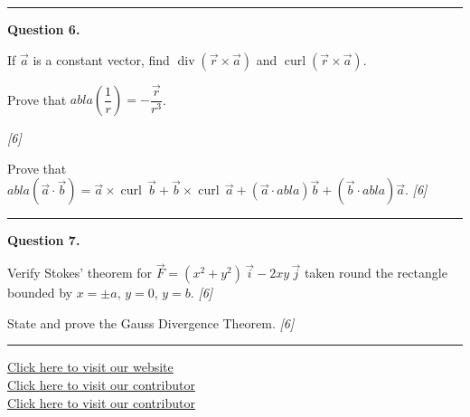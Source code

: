 \documentclass[11pt,a4paper]{article}
\newcommand{\pts}[1]{\hfill   \textit{[#1]}}
\begin{document}
\medskip\rule{\linewidth}{0.2pt}

\medskip


\noindent   \textbf{Question 6.}

\begin{parts}
  \item
  
\begin{parts}
    \item If $\vec{a}$ is a constant vector, find $\operatorname{div}(\vec{r} \times\vec{a})$ and $\operatorname{curl}(\vec{r} \times\vec{a})$.
    \item Prove that $
abla\!\left(\dfrac{1}{r}\right) = -\dfrac{\vec{r}}{r^3}$.
  \end{parts} \pts{6}
  \item Prove that $
abla(\vec{a}\cdot\vec{b}) = \vec{a} \times\operatorname{curl}\,\vec{b} + \vec{b} \times\operatorname{curl}\,\vec{a} + (\vec{a}\cdot
abla)\vec{b} + (\vec{b}\cdot
abla)\vec{a}$. \pts{6}
\end{parts}

\medskip\rule{\linewidth}{0.2pt}

\medskip


\noindent   \textbf{Question 7.}

\begin{parts}
  \item Verify Stokes' theorem for $\vec{F} = (x^2+y^2)\,\vec{i} - 2xy\,\vec{j}$ taken round the rectangle bounded by $x = \pm a$, $y = 0$, $y = b$. \pts{6}
  \item State and prove the Gauss Divergence Theorem. \pts{6}
\end{parts}

\vfill\rule{\linewidth}{0.4pt}

\begin{center}\small
  \href{https://bhu-exam.vercel.app/}{Click here to visit our website}\\[4pt]
  \href{https://me-aryan.vercel.app/}{Click here to visit our contributor}\\[4pt]
  \href{https://quashan-me.vercel.app/}{Click here to visit our contributor}
\end{center}
\end{document}
